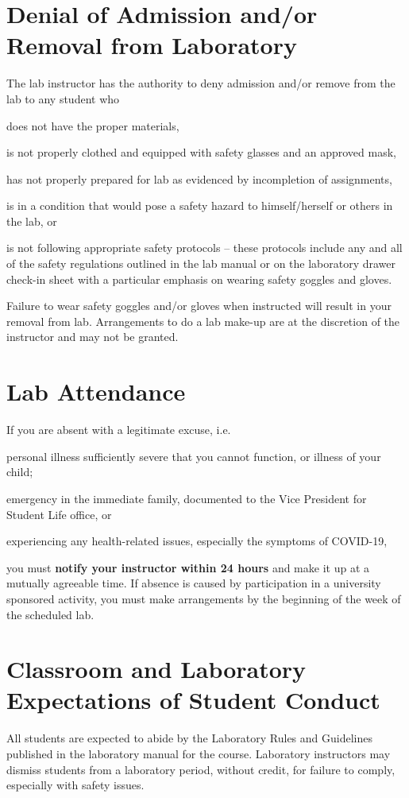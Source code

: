\documentclass[10pt,letterpaper]{article}
\begin{document}
\section*{Denial of Admission and/or Removal from Laboratory}
The lab instructor has the authority to deny admission and/or remove from the
lab to any student who
\begin{enumerate*}[label={(\arabic*)}]
	\item does not have the proper materials,
	\item is not properly clothed and equipped with safety
		glasses and an approved mask,
	\item has not properly prepared for lab as evidenced by
		incompletion of assignments,
	\item is in a condition that would pose a safety hazard
		to himself/herself or others in the lab, or 
	\item is not following appropriate safety protocols --
		these protocols include any and all of the
		safety regulations outlined in the lab manual
		or on the laboratory drawer check-in sheet with
		a particular emphasis on wearing safety goggles
		and gloves.
\end{enumerate*}
Failure to wear safety goggles and/or gloves when instructed
will result in your removal from lab.  Arrangements
to do a lab make-up are at the discretion of the instructor and
may not be granted.

\section*{Lab Attendance}
If you are absent with a legitimate excuse, i.e.
\begin{enumerate*}[label={(\arabic*)}]
	\item personal illness sufficiently severe that you
		cannot function, or illness of your child; 
	\item emergency in the immediate family, documented to
		the Vice President for Student Life office, or
	\item experiencing any health-related issues, especially the symptoms of
		COVID-19,
\end{enumerate*}
you must \textbf{notify your instructor within 24 hours} and
make it up at a mutually agreeable time. If absence is caused
by participation in a university sponsored activity, you must
make arrangements by the beginning of the week of the scheduled
lab.

\section*{Classroom and Laboratory Expectations of Student Conduct}
All students are expected to abide by the Laboratory Rules and Guidelines
published in the laboratory manual for the course. Laboratory instructors may
dismiss students from a laboratory period, without credit, for failure to
comply, especially with safety issues. 
\end{document}
